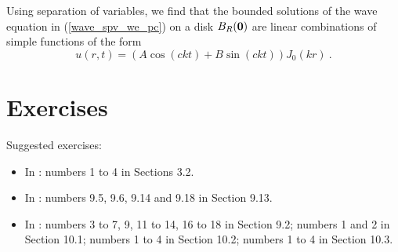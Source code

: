 \begin{rmk}
Using separation of variables, we find that the bounded solutions of
the wave equation in (\ref{wave_spv_we_pc}) on a disk $B_R(\mathbf{0})$
are linear combinations of simple functions of the form
\[
u(r,t) = \left(A \cos (ckt) + B \sin (ckt)\right)J_0(k r) \ .
\]
\end{rmk}

\section{Exercises}

Suggested exercises:

\begin{itemize}
\item In \cite{McO}: numbers 1 to 4 in Sections 3.2.
\item In \cite{PinRub}: numbers 9.5, 9.6, 9.14 and 9.18 in Section 9.13.
\item In \cite{Str}: numbers 3 to 7, 9, 11 to 14, 16 to 18 in Section
9.2; numbers 1 and 2 in Section 10.1; numbers 1 to 4 in Section 10.2;
numbers 1 to 4 in Section 10.3.
\end{itemize}

